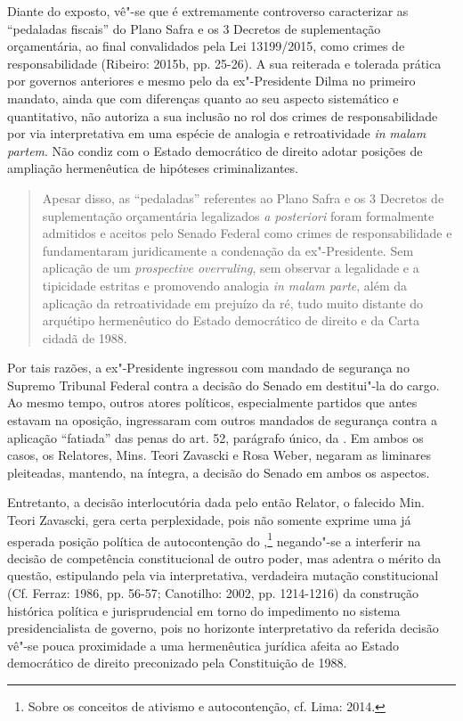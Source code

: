 Diante do exposto, vê"-se que é extremamente controverso caracterizar as
``pedaladas fiscais'' do Plano Safra e os 3 Decretos de suplementação
orçamentária, ao final convalidados pela Lei 13199/2015, como crimes de
responsabilidade (Ribeiro: 2015b, pp. 25-26). A sua reiterada e tolerada
prática por governos anteriores e mesmo pelo da ex"-Presidente Dilma no
primeiro mandato, ainda que com diferenças quanto ao seu aspecto
sistemático e quantitativo, não autoriza a sua inclusão no rol dos
crimes de responsabilidade por via interpretativa em uma espécie de
analogia e retroatividade \emph{in} \emph{malam partem}. Não condiz com
o Estado democrático de direito adotar posições de ampliação
hermenêutica de hipóteses criminalizantes.

\begin{quote}
Apesar disso, as ``pedaladas'' referentes ao Plano Safra e os 3 Decretos
de suplementação orçamentária legalizados \emph{a posteriori} foram
formalmente admitidos e aceitos pelo Senado Federal como crimes de
responsabilidade e fundamentaram juridicamente a condenação da
ex"-Presidente. Sem aplicação de um \emph{prospective overruling}, sem
observar a legalidade e a tipicidade estritas e promovendo analogia
\emph{in malam parte}, além da aplicação da retroatividade em prejuízo
da ré, tudo muito distante do arquétipo hermenêutico do Estado
democrático de direito e da Carta cidadã de 1988.
\end{quote}

Por tais razões, a ex"-Presidente ingressou com mandado de segurança no
Supremo Tribunal Federal contra a decisão do Senado em destitui"-la do
cargo. Ao mesmo tempo, outros atores políticos, especialmente partidos
que antes estavam na oposição, ingressaram com outros mandados de
segurança contra a aplicação ``fatiada'' das penas do art. 52, parágrafo
único, da . Em ambos os casos, os Relatores, Mins. Teori Zavascki e
Rosa Weber, negaram as liminares pleiteadas, mantendo, na íntegra, a
decisão do Senado em ambos os aspectos.

Entretanto, a decisão interlocutória dada pelo então Relator, o falecido
Min. Teori Zavascki, gera certa perplexidade, pois não somente exprime
uma já esperada posição política de autocontenção do ,\footnote{Sobre
  os conceitos de ativismo e autocontenção, cf. Lima: 2014.} negando"-se
a interferir na decisão de competência constitucional de outro poder,
mas adentra o mérito da questão, estipulando pela via interpretativa,
verdadeira mutação constitucional (Cf. Ferraz: 1986, pp. 56-57;
Canotilho: 2002, pp. 1214-1216) da construção histórica política e
jurisprudencial em torno do impedimento no sistema presidencialista de
governo, pois no horizonte interpretativo da referida decisão vê"-se
pouca proximidade a uma hermenêutica jurídica afeita ao Estado
democrático de direito preconizado pela Constituição de 1988.

